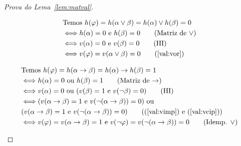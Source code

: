 \begin{proof}[Prova do Lema~\ref{lem:matval}]
\begin{provaporcasos}
\begin{provaporsubcasos}
                        \begin{align*}
                            &\textnormal{Temos }h(\phi) = h(\alpha \lor \beta) = h(\alpha) \lor h(\beta) = 0\\
                            &\Longleftrightarrow h(\alpha) = 0\textnormal{ e }h(\beta) = 0\tag*{(Matriz de $\lor$)}\\
                            &\Longleftrightarrow v(\alpha) = 0\textnormal{ e }v(\beta) = 0\tag*{(HI)}\\
                            &\Longleftrightarrow v(\phi) = v(\alpha \lor \beta) = 0\tag*{(\ref{val:vor})}
                        \end{align*}

                \end{provaporsubcasos}


                \begin{provaporsubcasos}
                        \begin{align*}
                            &\textnormal{Temos }h(\phi) = h(\alpha \to \beta) = h(\alpha) \to h(\beta) = 1\\
                            &\Longleftrightarrow h(\alpha) = 0\textnormal{ ou } h(\beta) = 1\tag*{(Matriz de $\to$)}\\
                            &\Longleftrightarrow v(\alpha) = 0\textnormal{ ou } (v(\beta) = 1\textnormal{ e }v(\neg \beta) = 0)\tag*{(HI)}\\
                            &\Longleftrightarrow (v(\alpha \to \beta) = 1\textnormal{ e }v(\neg (\alpha \to \beta)) = 0)\textnormal{ ou }\\& (v(\alpha \to \beta) = 1\textnormal{ e }v(\neg (\alpha \to \beta)) = 0)\tag*{((\ref{val:vimp}) e (\ref{val:vcip}))}\\
                            &\Longleftrightarrow v(\phi) = v(\alpha \to \beta) = 1\textnormal{ e }v(\neg \phi) = v(\neg (\alpha \to \beta)) = 0\tag*{(Idemp. $\lor$)}
                        \end{align*}
                            

\end{provaporsubcasos}
\end{provaporcasos}
\end{proof}

